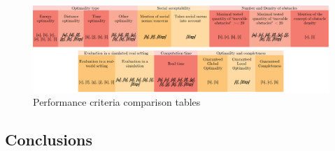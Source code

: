\begin{figure}[H]
\centering
\includegraphics[width=\linewidth]{Comparison_Table/c_performance}
\decoRule
\caption[Performance criteria comparison tables]{Performance criteria comparison tables}
\label{fig:performance_comparison_tables}
\end{figure}

\subsection{Conclusions}

